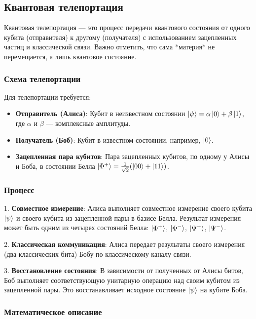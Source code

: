 \documentclass[12pt,a4paper]{article}
\begin{document}
		\subsection{Квантовая телепортация}
		Квантовая телепортация — это процесс передачи квантового состояния от одного кубита (отправителя) к другому (получателя) с использованием зацепленных частиц и классической связи. Важно отметить, что сама *материя* не перемещается, а лишь квантовое состояние.
		
		\subsubsection{Схема телепортации}
		
		Для телепортации требуется:
		
		\begin{itemize}
			\item \textbf{Отправитель (Алиса)}: Кубит в неизвестном состоянии $\ket{\psi} = \alpha \ket{0} + \beta \ket{1}$, где $\alpha$ и $\beta$ — комплексные амплитуды.
			\item \textbf{Получатель (Боб)}: Кубит в известном состоянии, например, $\ket{0}$.
			\item \textbf{Зацепленная пара кубитов}: Пара зацепленных кубитов, по одному у Алисы и Боба, в состоянии Белла $\ket{\Phi^+} = \frac{1}{\sqrt{2}}(\ket{00} + \ket{11})$.
		\end{itemize}
		
		
		\subsubsection{Процесс}
		
		1. \textbf{Совместное измерение}: Алиса выполняет совместное измерение своего кубита $\ket{\psi}$ и своего кубита из зацепленной пары в базисе Белла. Результат измерения может быть одним из четырех состояний Белла: $\ket{\Phi^+}$, $\ket{\Phi^-}$, $\ket{\Psi^+}$, $\ket{\Psi^-}$.
		
		2. \textbf{Классическая коммуникация}: Алиса передает результаты своего измерения (два классических бита) Бобу по классическому каналу связи.
		
		3. \textbf{Восстановление состояния}: В зависимости от полученных от Алисы битов, Боб выполняет соответствующую унитарную операцию над своим кубитом из зацепленной пары. Это восстанавливает исходное состояние $\ket{\psi}$ на кубите Боба.
		
		\subsubsection{Математическое описание}
		
\end{document}
